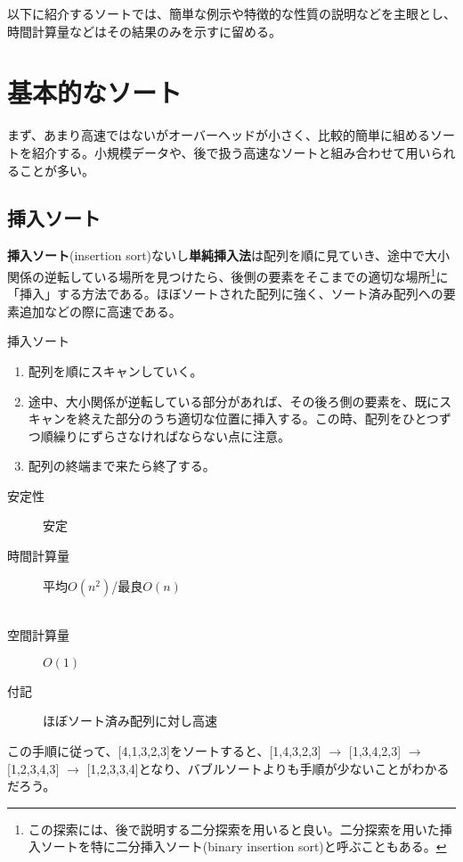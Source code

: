 以下に紹介するソートでは、簡単な例示や特徴的な性質の説明などを主眼とし、時間計算量などはその結果のみを示すに留める。

\section{基本的なソート}
まず、あまり高速ではないがオーバーヘッドが小さく、比較的簡単に組めるソートを紹介する。小規模データや、後で扱う高速なソートと組み合わせて用いられることが多い。

\subsection{挿入ソート}
\textbf{挿入ソート}(insertion sort)ないし\textbf{単純挿入法}は配列を順に見ていき、途中で大小関係の逆転している場所を見つけたら、後側の要素をそこまでの適切な場所\footnote{この探索には、後で説明する二分探索を用いると良い。二分探索を用いた挿入ソートを特に二分挿入ソート(binary insertion sort)と呼ぶこともある。}に「挿入」する方法である。ほぼソートされた配列に強く、ソート済み配列への要素追加などの際に高速である。
\begin{itembox}[l]{挿入ソート}
\begin{enumerate}
\item 配列を順にスキャンしていく。
\item 途中、大小関係が逆転している部分があれば、その後ろ側の要素を、既にスキャンを終えた部分のうち適切な位置に挿入する。この時、配列をひとつずつ順繰りにずらさなければならない点に注意。
\item 配列の終端まで来たら終了する。
\end{enumerate}
\begin{multicols}{2}
\begin{description}
\item[安定性] 安定
\item[時間計算量] 平均$O(n^2)$/最良$O(n)$　\\　
\item[空間計算量] $O(1)$
\item[付記] ほぼソート済み配列に対し高速
\end{description}
\end{multicols}
\end{itembox}

この手順に従って、[4,1,3,2,3]をソートすると、[1,4,3,2,3] $\rightarrow$ [1,3,4,2,3] $\rightarrow$ [1,2,3,4,3] $\rightarrow$ [1,2,3,3,4]となり、バブルソートよりも手順が少ないことがわかるだろう。

